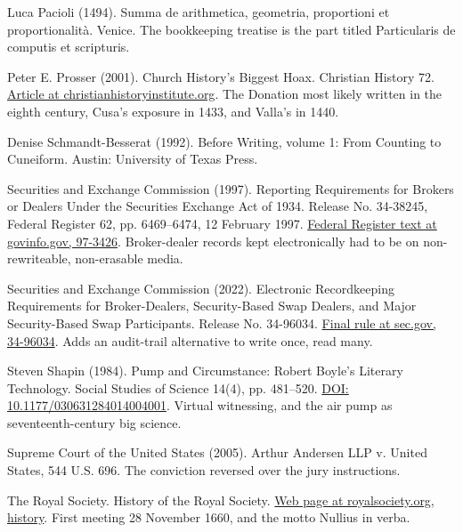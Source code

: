 \documentclass[11pt,twoside]{article}
\theoremstyle{thielethm}
\theoremstyle{thieledef}
\theoremstyle{thieledef}
\theoremstyle{thieledef}
\theoremstyle{thielethm}
\theoremstyle{thieleobs}
\theoremstyle{thielethm}
\begin{document}
\noindent Luca Pacioli (1494). Summa de arithmetica, geometria, proportioni et proportionalit\`a. Venice. The bookkeeping treatise is the part titled Particularis de computis et scripturis.
\par\medskip

\noindent Peter E. Prosser (2001). Church History's Biggest Hoax. Christian History 72. \href{https://christianhistoryinstitute.org/magazine/article/church-historys-biggest-hoax}{Article at christianhistoryinstitute.org}. The Donation most likely written in the eighth century, Cusa's exposure in 1433, and Valla's in 1440.
\par\medskip

\noindent Denise Schmandt-Besserat (1992). Before Writing, volume 1: From Counting to Cuneiform. Austin: University of Texas Press.
\par\medskip

\noindent Securities and Exchange Commission (1997). Reporting Requirements for Brokers or Dealers Under the Securities Exchange Act of 1934. Release No. 34-38245, Federal Register 62, pp. 6469--6474, 12 February 1997. \href{https://www.govinfo.gov/content/pkg/FR-1997-02-12/html/97-3426.htm}{Federal Register text at govinfo.gov, 97-3426}. Broker-dealer records kept electronically had to be on non-rewriteable, non-erasable media.
\par\medskip

\noindent Securities and Exchange Commission (2022). Electronic Recordkeeping Requirements for Broker-Dealers, Security-Based Swap Dealers, and Major Security-Based Swap Participants. Release No. 34-96034. \href{https://www.sec.gov/rules/final/2022/34-96034.pdf}{Final rule at sec.gov, 34-96034}. Adds an audit-trail alternative to write once, read many.
\par\medskip

\noindent Steven Shapin (1984). Pump and Circumstance: Robert Boyle's Literary Technology. Social Studies of Science 14(4), pp. 481--520. \href{https://doi.org/10.1177/030631284014004001}{DOI: 10.1177/030631284014004001}. Virtual witnessing, and the air pump as seventeenth-century big science.
\par\medskip

\noindent Supreme Court of the United States (2005). Arthur Andersen LLP v. United States, 544 U.S. 696. The conviction reversed over the jury instructions.
\par\medskip

\noindent The Royal Society. History of the Royal Society. \href{https://royalsociety.org/about-us/who-we-are/history/}{Web page at royalsociety.org, history}. First meeting 28 November 1660, and the motto Nullius in verba.
\par\medskip
\end{document}
